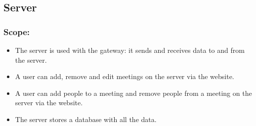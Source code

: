\begin{comment}
Template vir elke funksie
    \paragraph{Funksie naam}
			\begin{description}
			    \item{\textbf{Priority}:} %
			    \item{\textbf{Service Contract}:}%
			    \item{\textbf{Pre-conditions}:}%
    			    \begin{itemize}
    			        \item %
    			        \item %
    			    \end{itemize}
			    \item{\textbf{Post-conditions}:} %
    			    \begin{itemize}
    			    \item %
    			    \item %
    			    \end{itemize}
			\end{description}
\end{comment}








	\subsection{Server}
	    \subsubsection{Scope: }
	    \begin{itemize}
	    \item The server is used with the gateway: it sends and receives data to and from the server. 
	    \item A user can add, remove and edit meetings on the server via the website.
	    \item A user can add people to a meeting and remove people from a meeting on the server via the website.
	    \item The server stores a database with all the data.
	    \end{itemize}

